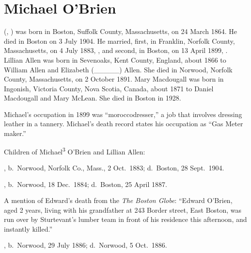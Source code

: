 \section{Michael O'Brien}

 (, ) was born in Boston, Suffolk County, Massachusetts, on 24 March 1864.\cite{Michael3OBrienBirth} He died in Boston on 3 July 1904.\cite{Michael3OBrienBirth} He married, first, in Franklin, Norfolk County, Massachusetts, on 4 July 1883, ,\cite{LillianAllenMarriage} and second, in Boston, on 13 April 1899, .\cite{MaryMacdougallMarriage} Lillian Allen was born in Sevenoaks, Kent County, England, about 1866 to William Allen and Elizabeth (\_\_\_\_\_) Allen.\cite{LillianAllenMarriage} She died in Norwood, Norfolk County, Massachusetts, on 2 October 1891.\cite{LillianAllenDeath} Mary Macdougall was born in Ingonish, Victoria County, Nova Scotia, Canada, about 1871 to Daniel Macdougall and Mary McLean.\cite{MaryMacdougallMarriage} She died in Boston in 1928.\cite{MaryMacdougallDeath}

Michael's occupation in 1899 was ``moroccodresser,''\cite{MaryMacdougallMarriage} a job that involves dressing leather in a tannery.\cite{moroccodresser} Michael's death record states his occupation as ``Gas Meter maker.''\cite{Michael3OBrienDeath} 

\begin{KidsIntro}
	Children of Michael\textsuperscript{3} O'Brien and Lillian Allen:
\end{KidsIntro}

\begin{Kids}
	
	, b.\ Norwood, Norfolk Co., Mass., 2 Oct.\ 1883;\cite{Arthur4OBrienBirth} d.\ Boston, 28 Sept.\ 1904.\cite{Arthur4OBrienDeath}
	
	, b.\ Norwood, 18 Dec.\ 1884;\cite{Edward4OBrienBirth} d.\ Boston, 25 April 1887.\cite{Edward4OBrienDeath}
	
	\begin{KidsMoreText}
		A mention of Edward's death from the \textit{The Boston Globe}: ``Edward O'Brien, aged 2 years, living with his grandfather at 243 Border street, East Boston, was run over by Sturtevant's lumber team in front of his residence this afternoon, and instantly killed.''\cite{Edward4OBrienDeath2}
	\end{KidsMoreText}
	
	, b.\ Norwood, 29 July 1886;\cite{Elizabeth4OBrienBirth} d.\ Norwood, 5 Oct.\ 1886.\cite{Elizabeth4OBrienDeath}
	
\end{Kids}

